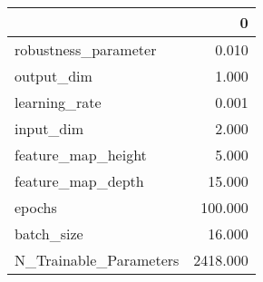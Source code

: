 \begin{tabular}{lr}
\toprule
{} &         0 \\
\midrule
robustness\_parameter   &     0.010 \\
output\_dim             &     1.000 \\
learning\_rate          &     0.001 \\
input\_dim              &     2.000 \\
feature\_map\_height     &     5.000 \\
feature\_map\_depth      &    15.000 \\
epochs                 &   100.000 \\
batch\_size             &    16.000 \\
N\_Trainable\_Parameters &  2418.000 \\
\bottomrule
\end{tabular}
